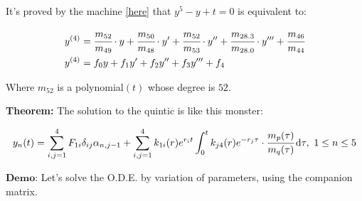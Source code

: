 \documentclass[12pt]{article}
\begin{document}
It's proved by the machine \href{https://drive.google.com/file/d/1z0QdJhS-eVbJG3I8OK82LsEDsDLimAiU/view?usp=sharing}{\color{blue}\underline{[here]}} that $y^5 - y + t = 0$ is equivalent to:

\begin{align}
y^{(4)} &= \cfrac{m_{52}}{m_{49}}\cdot y + \cfrac{m_{50}}{m_{48}}\cdot y' + \cfrac{m_{52}}{m_{53}}\cdot y'' + \cfrac{m_{28.3}}{m_{28.0}}\cdot y''' + \cfrac{m_{46}}{m_{44}} \\
y^{(4)} &= f_0 y + f_1 y' + f_2 y'' + f_3 y''' + f_4
\end{align}

Where $m_{52}$ is a polynomial$(t)$ whose degree is $52$.

\Large

\textbf{Theorem:} The solution to the quintic is like this monster:

\begin{align}
y_n(t) = \sum_{i,j=1}^4 F_{1i} \delta_{ij} \alpha_{n,j-1} + \sum_{i,j=1}^4 k_{1i}(r) e^{r_i t} \int_0^t k_{j4}(r) e^{-r_j\tau} \cdot \cfrac{m_p(\tau)}{m_q(\tau)}\,\mathrm{d}\tau,\,\,1\le n \le 5 \nonumber
\end{align}

\normalsize

\vspace{3mm}

$\textbf{Demo:}$ Let's solve the O.D.E. by variation of parameters, using the companion matrix.
\end{document}
